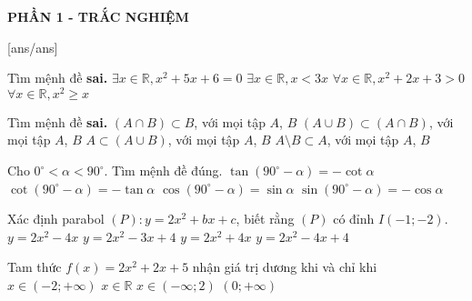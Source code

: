 
\begin{center}
	\textbf{PHẦN 1 - TRẮC NGHIỆM}
\end{center}
[ans/ans]
\begin{ex}%
	Tìm mệnh đề {\bf sai.}
	\choice
	{$\exists x\in\mathbb{R}, x^2+5x+6=0$}
	{$\exists x\in\mathbb{R},x<3x$}
	{$\forall x\in\mathbb{R},x^2+2x+3>0$}
	{\True $\forall x\in\mathbb{R}, x^2\ge x$}
\end{ex}
\begin{ex}%
	Tìm mệnh đề {\bf sai.}
	\choice
	{$(A\cap B)\subset B$, với mọi tập $A$, $B$}
	{\True $(A\cup B)\subset (A\cap B)$, với mọi tập $A$, $B$}
	{$A\subset (A\cup B)$, với mọi tập $A$, $B$}
	{$A\setminus B \subset A$, với mọi tập $A$, $B$}
\end{ex}
\begin{ex}%
	Cho $0^\circ <\alpha <90^\circ$. Tìm mệnh đề đúng.
	\choice
	{$\tan (90^\circ-\alpha)=-\cot\alpha$}
	{$\cot (90^\circ-\alpha)=-\tan\alpha$}
	{\True $\cos (90^\circ-\alpha)=\sin\alpha$}
	{$\sin (90^\circ-\alpha)=-\cos\alpha$}
\end{ex}
\begin{ex}%
	Xác định parabol $(P)\colon y=2x^2+bx+c$, biết rằng $(P)$ có đỉnh $I(-1;-2)$.
	\choice
	{$y=2x^2-4x$}
	{$y=2x^2-3x+4$}
	{\True $y=2x^2+4x$}
	{$y=2x^2-4x+4$}
\end{ex}
\begin{ex}%
	Tam thức $f(x)=2x^2+2x+5$ nhận giá trị dương khi và chỉ khi
	\choice
	{$x\in (-2;+\infty)$}
	{\True $x\in\mathbb{R}$}
	{$x\in (-\infty;2)$}
	{$(0;+\infty)$}
\end{ex}
